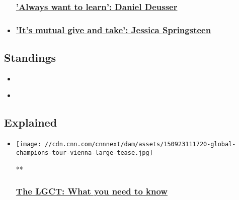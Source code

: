\begin{itemize}
{  \subsubsection{\texorpdfstring{\href{/2019/07/10/sport/daniel-deusser-secrets-of-success-equestrian-spt-intl/index.html}{'Always
  want to learn': Daniel Deusser
  }}{'Always want to learn': Daniel Deusser }}\label{always-want-to-learn-daniel-deusser-}}
\item
  \hypertarget{its-mutual-give-and-take-jessica-springsteen}{%
  \subsubsection{\texorpdfstring{\href{/2019/05/28/sport/jessica-springsteen-equestrian-horses-secrets-of-success-spt-intl/index.html}{'It's
  mutual give and take': Jessica
  Springsteen}}{'It's mutual give and take': Jessica Springsteen}}\label{its-mutual-give-and-take-jessica-springsteen}}
\end{itemize}

\hypertarget{standings-}{%
\subsection{Standings~}\label{standings-}}

\begin{itemize}
\item
\end{itemize}

\begin{itemize}
\item
\end{itemize}

\hypertarget{explained-}{%
\subsection{Explained~}\label{explained-}}

\begin{itemize}
\item
  \href{/videos/sports/2017/03/29/longines-global-champions-tour-show-jumping-explainer-horses-cnn-equestrian-orig.cnn}{}

  \texttt{[image: //cdn.cnn.com/cnnnext/dam/assets/150923111720-global-champions-tour-vienna-large-tease.jpg]}

  **

  \hypertarget{the-lgct-what-you-need-to-know}{%
  \subsubsection{\texorpdfstring{\href{/videos/sports/2017/03/29/longines-global-champions-tour-show-jumping-explainer-horses-cnn-equestrian-orig.cnn}{The
  LGCT: What you need to
  know}}{The LGCT: What you need to know}}\label{the-lgct-what-you-need-to-know}}
\end{itemize}

